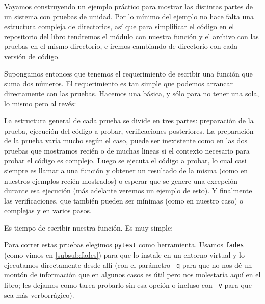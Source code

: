 Vayamos construyendo un ejemplo práctico para mostrar las distintas partes de un sistema con pruebas de unidad. Por lo mínimo del ejemplo no hace falta una estructura compleja de directorios, así que para simplificar el código en el repositorio del libro tendremos el módulo con nuestra función y el archivo con las pruebas en el mismo directorio, e iremos cambiando de directorio con cada versión de código.

Supongamos entonces que tenemos el requerimiento de escribir una función que suma dos números. El requerimiento es tan simple que podemos arrancar directamente con las pruebas. Hacemos una básica, y sólo para no tener una sola, lo mismo pero al revés:


La estructura general de cada prueba se divide en tres partes: preparación de la prueba, ejecución del código a probar, verificaciones posteriores. La preparación de la prueba varía mucho según el caso, puede ser inexistente como en las dos pruebas que mostramos recién o de muchas lineas si el contexto necesario para probar el código es complejo. Luego se ejecuta el código a probar, lo cual casi siempre es llamar a una función y obtener un resultado de la misma (como en nuestros ejemplos recién mostrados) o esperar que se genere una excepción durante esa ejecución (más adelante veremos un ejemplo de esto). Y finalmente las verificaciones, que también pueden ser mínimas (como en nuestro caso) o complejas y en varios pasos.

Es tiempo de escribir nuestra función. Es muy simple:


Para correr estas pruebas elegimos \texttt{pytest} como herramienta. Usamos \texttt{fades} (como vimos en \ref{subsub:fades}) para que lo instale en un entorno virtual y lo ejecutamos directamente desde allí (con el parámetro \texttt{-q} para que no nos dé un montón de información que en algunos casos es útil pero nos molestaría aquí en el libro; les dejamos como tarea probarlo sin esa opción o incluso con \texttt{-v} para que sea más verborrágico).


